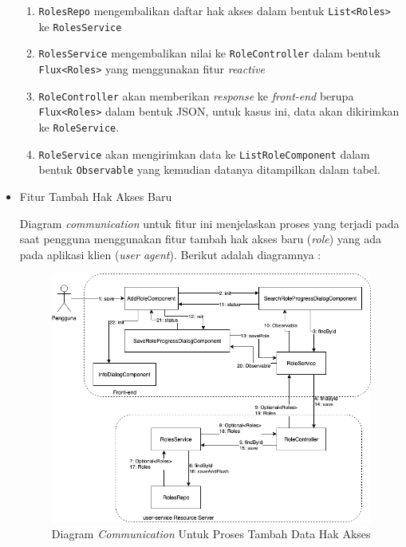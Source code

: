 \documentclass[pdftex,12pt, oneside]{article}
\begin{document}
\begin{itemize}
\begin{enumerate}
		\item \texttt{RolesRepo} mengembalikan daftar hak akses dalam bentuk \texttt{List<Roles>} ke \texttt{RolesService}
		
		\item \texttt{RolesService} mengembalikan nilai ke \texttt{RoleController} dalam bentuk \texttt{Flux<Roles>} yang menggunakan fitur \textit{reactive}
		
		\item \texttt{RoleController} akan memberikan \textit{response} ke \textit{front-end} berupa \texttt{Flux<Roles>} dalam bentuk JSON, untuk kasus ini, data akan dikirimkan ke \texttt{RoleService}.
		
		\item \texttt{RoleService} akan mengirimkan data ke \texttt{ListRoleComponent} dalam bentuk \texttt{Observable} yang kemudian datanya ditampilkan dalam tabel.
	\end{enumerate}
	
	\item Fitur Tambah Hak Akses Baru
	
	Diagram \textit{communication} untuk fitur ini menjelaskan proses yang terjadi pada saat pengguna menggunakan fitur tambah hak akses baru (\textit{role}) yang ada pada aplikasi klien (\textit{user agent}). Berikut adalah diagramnya :
	
	\begin{figure}[H]
		\centering
		\includegraphics[width=1\textwidth]{./resources/comm-dia-add-role}
		\caption{Diagram \textit{Communication} Untuk Proses Tambah Data Hak Akses}
		\label{fig:comm-dia-add-role}
	\end{figure}
	

\end{itemize}
\end{document}
